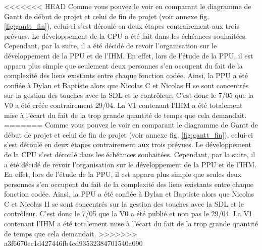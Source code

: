 <<<<<<< HEAD
Comme vous pouvez le voir en comparant le diagramme de Gantt de début de projet et celui de fin de projet (voir annexe fig. \ref{fig:gantt_fin}), celui-ci s'est déroulé en deux étapes contrairement aux trois prévues. Le développement de la CPU a été fait dans les échéances souhaitées. Cependant, par la suite, il a été décidé de revoir l'organisation sur le développement de la PPU et de l'IHM. En effet, lors de l'étude de la PPU, il est apparu plus simple que seulement deux personnes s'en occupent du fait de la complexité des liens existants entre chaque fonction codée. Ainsi, la PPU a été confiée à Dylan et Baptiste alors que Nicolas C et Nicolas H se sont concentrés sur la gestion des touches avec la SDL et le contrôleur. C'est donc le 7/05 que la V0 a été créée contrairement 29/04. La V1 contenant l'IHM a été totalement mise à l'écart du fait de la trop grande quantité de temps que cela demandait.
=======
Comme vous pouvez le voir en comparant le diagramme de Gantt de début de projet et celui de fin de projet (voir annexe fig. \ref{fig:gantt_fin}), celui-ci s'est déroulé en deux étapes contrairement aux trois prévues. Le développement de la CPU s'est déroulé dans les échéances souhaitées. Cependant, par la suite, il a été décidé de revoir l'organisation sur le développement de la PPU et de l'IHM. En effet, lors de l'étude de la PPU, il est apparu plus simple que seules deux personnes s'en occupent du fait de la complexité des liens existants entre chaque fonction codée. Ainsi, la PPU a été confiée à Dylan et Baptiste alors que Nicolas C et Nicolas H se sont concentrés sur la gestion des touches avec la SDL et le contrôleur. C'est donc le 7/05 que la V0 a été publié et non pas le 29/04. La V1 contenant l'IHM a été totalement mise à l'écart du fait de la trop grande quantité de temps que cela demandait.
>>>>>>> a3f6670ec1d427446fb4cd93532384701540a090
